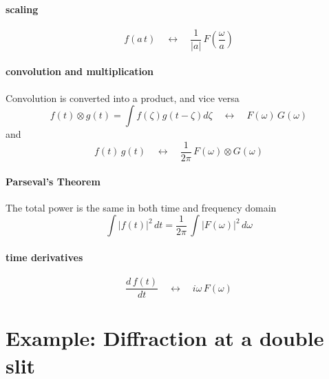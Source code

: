 \paragraph{scaling}  
\begin{equation}
 f( a \, t) \quad \leftrightarrow \quad 
\frac{1}{|a|} \, F \left( \frac{\omega}{a} \right)  
\end{equation}


\paragraph{convolution and multiplication} Convolution is converted into a product, and vice versa
\begin{equation}
 f(t) \otimes g(t) = \int f(\zeta) g(t- \zeta) d\zeta 
 \quad \leftrightarrow \quad 
 F(\omega) \, G(\omega)
\end{equation}
and
\begin{equation}
 f(t) \, g(t) 
 \quad \leftrightarrow \quad 
\frac{1}{2 \pi} \, F(\omega) \otimes G(\omega)
\end{equation}

\paragraph{Parseval's Theorem} The total power is the same in both time and frequency domain
\begin{equation}
 \int |f(t) |^2 \, dt = \frac{1}{2 \pi} \, \int | F (\omega ) | ^2 \, d\omega
\end{equation}

\paragraph{time derivatives}
\begin{equation}
 \frac{d \, f(t)}{dt} 
 \quad \leftrightarrow \quad 
i \omega \, F(\omega) 
\end{equation}


\section{Example: Diffraction at a double slit}

